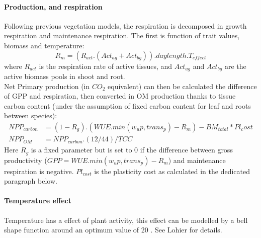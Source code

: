 \paragraph{Production, and respiration} Following previous vegetation models, the respiration is decomposed in growth respiration and maintenance respiration. The first is function of trait values, biomass and temperature:
\begin{equation}
R_{m} = \left(R_{act}.\left(Act_{ag} + Act_{bg}\right)\right) . daylength . T_{effect}
\end{equation}
where $R_{act}$ is the respiration rate of active tissues, and $Act_{ag}$ and $Act_{bg}$ are the active biomass pools in shoot and root.\\
\indent Net Primary production (in $CO_{2}$ equivalent) can then be calculated the difference of GPP and respiration, then converted in OM production thanks to tissue carbon content (under the assumption of fixed carbon content for leaf and roots between species):
 \begin{align}
 NPP_{carbon} &= (1- R_{g}) . (WUE . min(w_up, trans_p) - R_{m}) - BM_{total} * Pl_cost\\
 NPP_{OM} &= NPP_{carbon} . (12/44) / TCC
\end{align} 
Here $R_{g}$ is a fixed parameter but is set to $0$ if the difference between gross productivity ($GPP = WUE . min(w_up, trans_p) - R_{m}$) and maintenance respiration is negative. $Pl_{cost}$ is the plasticity cost as calculated in the dedicated paragraph below.

\paragraph{Temperature effect} Temperature has a effect of plant activity, this effect can be modelled by a bell shape function around an optimum value of 20 \celsius . See Lohier for details.


